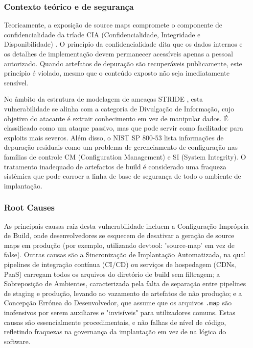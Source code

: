 \subsubsection{Contexto teórico e de segurança}
\label{subsubsec:contexto-teorico-SME}

Teoricamente, a exposição de source maps compromete o componente de confidencialidade da tríade CIA (Confidencialidade, Integridade e Disponibilidade) \cite{ref47}. O princípio da confidencialidade dita que os dados internos e os detalhes de implementação devem permanecer acessíveis apenas a pessoal autorizado. Quando artefatos de depuração são recuperáveis publicamente, este princípio é violado, mesmo que o conteúdo exposto não seja imediatamente sensível. 

No âmbito da estrutura de modelagem de ameaças STRIDE \cite{ref44}, esta vulnerabilidade se alinha com a categoria de Divulgação de Informação, cujo objetivo do atacante é extrair conhecimento em vez de manipular dados. É classificado como um ataque passivo, mas que pode servir como facilitador para exploits mais severos. Além disso, o NIST SP 800-53 \cite{ref3} lista informações de depuração residuais como um problema de gerenciamento de configuração nas famílias de controle CM (Configuration Management) e SI (System Integrity). O tratamento inadequado de artefactos de build é considerado uma fraqueza sistêmica que pode corroer a linha de base de segurança de todo o ambiente de implantação. 

\subsubsection{Root Causes}
\label{subsubsec:root-causes-SME}

As principais causas raiz desta vulnerabilidade incluem a Configuração Imprópria de Build, onde desenvolvedores se esquecem de desativar a geração de source maps em produção (por exemplo, utilizando devtool: 'source-map' em vez de false). Outras causas são a Sincronização de Implantação Automatizada, na qual pipelines de integração contínua (CI/CD) ou serviços de hospedagem (CDNs, PaaS) carregam todos os arquivos do diretório de build sem filtragem; a Sobreposição de Ambientes, caracterizada pela falta de separação entre pipelines de staging e produção, levando ao vazamento de artefatos de não produção; e a Concepção Errónea do Desenvolvedor, que assume que os arquivos \texttt{.map} são inofensivos por serem auxiliares e "invisíveis" para utilizadores comuns. Estas causas são essencialmente procedimentais, e não falhas de nível de código, refletindo fraquezas na governança da implantação em vez de na lógica do software. \cite{ref8}

